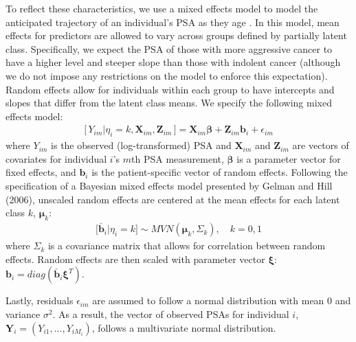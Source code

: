 \documentclass[12pt, letterpaper]{article}
\newcommand{\bmbeta}{\boldsymbol{\beta}}
\newcommand{\bmxi}{\boldsymbol{\xi}}
\newcommand{\bmmu}{\boldsymbol{\mu}}
\newcommand{\bmY}{\mathbf{Y}}
\newcommand{\bmZ}{\mathbf{Z}}
\newcommand{\bmX}{\mathbf{X}}
\newcommand{\bmb}{\mathbf{b}}
\newcommand{\beas}{\begin{eqnarray*}}
\newcommand{\eeas}{\end{eqnarray*}}
\newcommand{\mydots}{...}
\begin{document}
To reflect these characteristics, we use a mixed effects model to model the anticipated trajectory of an individual's PSA as they age \cite{Laird1982}. In this model, mean effects for predictors are allowed to vary across groups defined by partially latent class. Specifically, we expect the PSA of those with more aggressive cancer to have a higher level and steeper slope than those with indolent cancer (although we do not impose any restrictions on the model to enforce this expectation).  Random effects allow for individuals within each group to have intercepts and slopes that differ from the latent class means. We specify the following mixed effects model: 
\beas
\big[\, Y_{im} | \eta_i=k, \bmX_{im}, \bmZ_{im}\,\big] = \bmX_{im}\bmbeta + \bmZ_{im}\bmb_i + \epsilon_{im}
\eeas
where $Y_{im}$ is the observed (log-transformed) PSA and $\bmX_{im}$ and $\bmZ_{im}$ are vectors of covariates for individual $i$'s $m$th PSA measurement, $\bmbeta$ is a parameter vector for fixed effects, and $\bmb_i$ is the patient-specific vector of random effects. Following the specification of a Bayesian mixed effects model presented by Gelman and Hill (2006)\nocite{Gelman2006}, unscaled random effects are centered at the mean effects for each latent class $k$, $\bmmu_k$:
\beas
\big[\check{\bmb_i} | \eta_i=k\big] \sim MVN ( \bmmu_k, \Sigma_k), \quad k=0,1 
\eeas
where $\Sigma_k$ is a covariance matrix that allows for correlation between random effects. Random effects are then scaled with parameter vector $\bmxi$: $\bmb_i = diag(\check{\bmb_i}\bmxi^T)$.

Lastly, residuals $\epsilon_{im}$ are assumed to follow a normal distribution with mean 0 and variance $\sigma^2$. As a result, the vector of observed PSAs for individual $i$, $\bmY_i=(Y_{i1},\mydots,Y_{iM_i})$, follows a multivariate normal distribution. 


\end{document}
